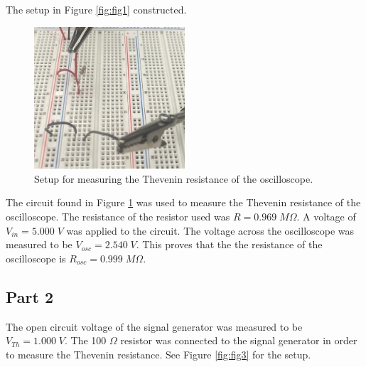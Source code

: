 \documentclass{article}
\begin{document}
The setup in Figure \ref{fig:fig1} constructed.
\begin{figure}[H]
	\centering
	\includegraphics[width=0.5\textwidth]{circuit photo.jpg}
	\caption{Setup for measuring the Thevenin resistance of the oscilloscope.}
	\label{fig:fig2}
\end{figure}
The circuit found in Figure \ref{fig:fig2} was used to measure the Thevenin resistance of the 
oscilloscope. The resistance of the resistor used was $R = 0.969 \; M\Omega$. A voltage
of $V_{in} = 5.000 \; V$ was applied to the circuit. The voltage across the 
oscilloscope was measured to be $V_{osc} = 2.540 \; V$. This proves that the
the resistance of the oscilloscope is $R_{osc} = 0.999 \; M\Omega$.

\subsection*{Part 2}
The open circuit voltage of the signal generator was measured to 
be $V_{Th} = 1.000 \; V$. The 100 $\Omega$ resistor was connected to 
the signal generator in order to measure the Thevenin resistance. See
Figure \ref{fig:fig3} for the setup.
\end{document}
